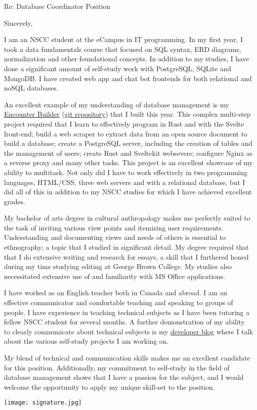 \documentclass[11pt,a4paper]{moderncv}
\date{March 15, 2024}
\begin{document}
	\opening{Re: Database Coordinator Position}
	\closing{Sincerely,}	
		        
	\makelettertitle
	\justify 
	\vspace{-1em}
I am an NSCC student at the eCampus in IT programming. In my first year, I took a data fundamentals course that focused on SQL syntax, ERD diagrams, normalization and other foundational concepts. In addition to my studies, I have done a significant amount of self-study work with PostgreSQL, SQLite and MongoDB. I have created web app and chat bot frontends for both relational and noSQL databases. 

An excellent example of my understanding of database management is my \textcolor{blue}{\href{https://alembichead.com/encounter-builder}{Encounter Builder}} (\textcolor{blue}{\href{https://github.com/Naokotani/encounter-builder}{git repository}}) that I built this year. This complex multi-step project required that I learn to effectively program in Rust and with the Svelte front-end; build  a web scraper to extract data from an open source document to build a database; create a PostgreSQL server, including the creation of tables and the management of users; create Rust and Sveltekit websevers; configure Nginx as a reverse proxy and many other tasks. This project is an excellent showcase of my ability to multitask. Not only did I have to work effectively in two programming languages, HTML/CSS, three web servers and with a relational database, but I did all of this in addition to my NSCC studies for which I have achieved excellent grades. 

My bachelor of arts degree in cultural anthropology makes me perfectly suited to the task of inviting various view points and itemizing user requirements. Understanding and documenting views and needs of others is essential to ethnography; a topic that I studied in significant detail. My degree required that that I do extensive writing and research for essays, a skill that I furthered honed during my time studying editing at George Brown College. My studies also necessitated extensive use of and familiarity with MS Office applications.

I have worked as an English teacher both in Canada and abroad. I am an effective communicator and comfortable teaching and speaking to groups of people. I have experience in teaching technical subjects as I have been tutoring a fellow NSCC student for several months. A further demonstration of my ability to clearly  communicate about technical  subjects is my \textcolor{blue}{\href{https://chris-hughes.dev/}{developer blog}} where I talk about the various self-study projects I am working on. 

My blend of technical and communication skills makes me an excellent candidate for this position. Additionally, my commitment to self-study in the field of database management shows that I have a passion for the subject, and I would welcome the opportunity to apply my unique skill-set to the position.

\makeletterclosing	
\texttt{[image: signature.jpg]}	
\end{document}
